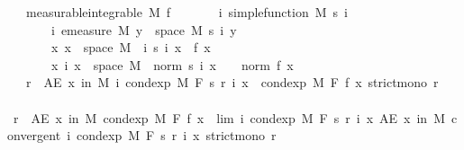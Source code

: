 \begin{isabellebody}
\ \ \ {\isacharbrackleft}{\kern0pt}measurable{\isacharbrackright}{\kern0pt}{\isacharcolon}{\kern0pt}{\isachardoublequoteopen}integrable\ M\ f{\isachardoublequoteclose}\isanewline
\ \ \ \ \ \ \ {\isachardoublequoteopen}{\isasymAnd}i{\isachardot}{\kern0pt}\ simple{\isacharunderscore}{\kern0pt}function\ M\ {\isacharparenleft}{\kern0pt}s\ i{\isacharparenright}{\kern0pt}{\isachardoublequoteclose}\isanewline
\ \ \ \ \ \ \ {\isachardoublequoteopen}{\isasymAnd}i{\isachardot}{\kern0pt}\ emeasure\ M\ {\isacharbraceleft}{\kern0pt}y\ {\isasymin}\ space\ M{\isachardot}{\kern0pt}\ s\ i\ y\ {\isasymnoteq}\ {}{\isacharbraceright}{\kern0pt}\ {\isasymnoteq}\ {\isasyminfinity}{\isachardoublequoteclose}\isanewline
\ \ \ \ \ \ \ {\isachardoublequoteopen}{\isasymAnd}x{\isachardot}{\kern0pt}\ x\ {\isasymin}\ space\ M\ {\isasymLongrightarrow}\ {\isacharparenleft}{\kern0pt}{\isasymlambda}i{\isachardot}{\kern0pt}\ s\ i\ x{\isacharparenright}{\kern0pt}\ {\isasymlonglonglongrightarrow}\ f\ x{\isachardoublequoteclose}\isanewline
\ \ \ \ \ \ \ {\isachardoublequoteopen}{\isasymAnd}x\ i{\isachardot}{\kern0pt}\ x\ {\isasymin}\ space\ M\ {\isasymLongrightarrow}\ norm\ {\isacharparenleft}{\kern0pt}s\ i\ x{\isacharparenright}{\kern0pt}\ {\isasymle}\ {}\ {\isacharasterisk}{\kern0pt}\ norm\ {\isacharparenleft}{\kern0pt}f\ x{\isacharparenright}{\kern0pt}{\isachardoublequoteclose}\isanewline
\ \ \ r\ \ {\isachardoublequoteopen}AE\ x\ in\ M{\isachardot}{\kern0pt}\ {\isacharparenleft}{\kern0pt}{\isasymlambda}i{\isachardot}{\kern0pt}\ cond{\isacharunderscore}{\kern0pt}exp\ M\ F\ {\isacharparenleft}{\kern0pt}s\ {\isacharparenleft}{\kern0pt}r\ i{\isacharparenright}{\kern0pt}{\isacharparenright}{\kern0pt}\ x{\isacharparenright}{\kern0pt}\ {\isasymlonglonglongrightarrow}\ cond{\isacharunderscore}{\kern0pt}exp\ M\ F\ f\ x{\isachardoublequoteclose}\ {\isachardoublequoteopen}strict{\isacharunderscore}{\kern0pt}mono\ r{\isachardoublequoteclose}\isanewline
%
\isadelimproof
%
\endisadelimproof
%
\isatagproof
{}\isamarkupfalse%
\ {\isacharminus}{\kern0pt}\isanewline
\ \ \isamarkupfalse%
\ r\ \ {\isachardoublequoteopen}AE\ x\ in\ M{\isachardot}{\kern0pt}\ cond{\isacharunderscore}{\kern0pt}exp\ M\ F\ f\ x\ {\isacharequal}{\kern0pt}\ lim\ {\isacharparenleft}{\kern0pt}{\isasymlambda}i{\isachardot}{\kern0pt}\ cond{\isacharunderscore}{\kern0pt}exp\ M\ F\ {\isacharparenleft}{\kern0pt}s\ {\isacharparenleft}{\kern0pt}r\ i{\isacharparenright}{\kern0pt}{\isacharparenright}{\kern0pt}\ x{\isacharparenright}{\kern0pt}{\isachardoublequoteclose}\ {\isachardoublequoteopen}AE\ x\ in\ M{\isachardot}{\kern0pt}\ convergent\ {\isacharparenleft}{\kern0pt}{\isasymlambda}i{\isachardot}{\kern0pt}\ cond{\isacharunderscore}{\kern0pt}exp\ M\ F\ {\isacharparenleft}{\kern0pt}s\ {\isacharparenleft}{\kern0pt}r\ i{\isacharparenright}{\kern0pt}{\isacharparenright}{\kern0pt}\ x{\isacharparenright}{\kern0pt}{\isachardoublequoteclose}\ {\isachardoublequoteopen}strict{\isacharunderscore}{\kern0pt}mono\ r{\isachardoublequoteclose}\ \isamarkupfalse%

\end{isabellebody}
